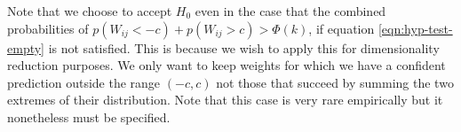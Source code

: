 Note that we choose to accept $H_0$ even in the case that the combined probabilities of $p(W_{ij} < -c) + p(W_{ij} > c) > \Phi(k)$, if equation \ref{eqn:hyp-test-empty} is not satisfied. This is because we wish to apply this for dimensionality reduction purposes. We only want to keep weights for which we have a confident prediction outside the range $(-c, c)$ not those that succeed by summing the two extremes of their distribution. Note that this case is very rare empirically but it nonetheless must be specified.